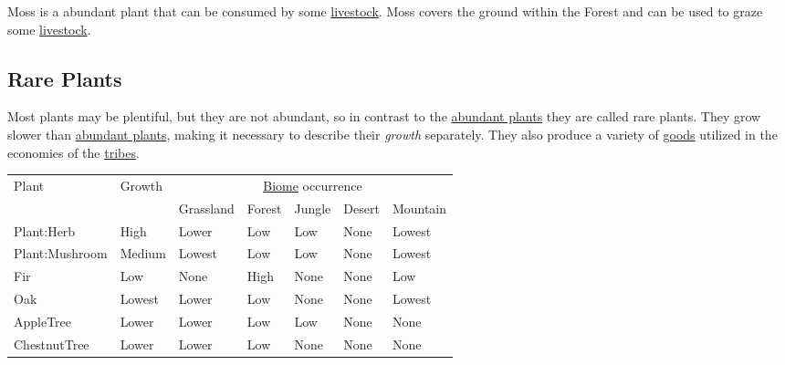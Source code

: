 \Gls*{Moss} is a abundant plant that can be consumed by some \hyperref[ch:World:Inhabitants:Livestock]{livestock}.
\Gls*{Moss} covers the ground within the \gls{Forest} and can be used to graze some \hyperref[ch:World:Inhabitants:Livestock]{livestock}.

\subsection{Rare Plants}\label{ch:World:Plants:Rare}

Most plants may be plentiful, but they are not abundant, so in contrast to the
\hyperref[ch:World:Plants:Abundant]{abundant plants} they are called rare
plants. They grow slower than \hyperref[ch:World:Plants:Abundant]{abundant
	plants}, making it necessary to describe their \emph{growth} separately. They
also produce a variety of \hyperref[ch:Goods:Nature:Plants]{goods} utilized in
the economies of the \hyperref[ch:Tribes]{tribes}.

\begin{longtable}{lllllll}
	\toprule
	Plant                & Growth & \multicolumn{5}{c}{\hyperref[ch:World:Biomes]{Biome} occurrence}                                                               \\
	                     &        & \Gls{Grassland}                                                  & \Gls{Forest} & \Gls{Jungle} & \Gls{Desert} & \Gls{Mountain} \\
	\midrule
	\Gls{Plant:Herb}     & High   & Lower                                                            & Low          & Low          & None         & Lowest         \\
	\Gls{Plant:Mushroom} & Medium & Lowest                                                           & Low          & Low          & None         & Lowest         \\
	\Gls{Fir}            & Low    & None                                                             & High         & None         & None         & Low            \\
	\Gls{Oak}            & Lowest & Lower                                                            & Low          & None         & None         & Lowest         \\
	\Gls{AppleTree}      & Lower  & Lower                                                            & Low          & Low          & None         & None           \\
	\Gls{ChestnutTree}   & Lower  & Lower                                                            & Low          & None         & None         & None           \\
	\bottomrule
\end{longtable}

